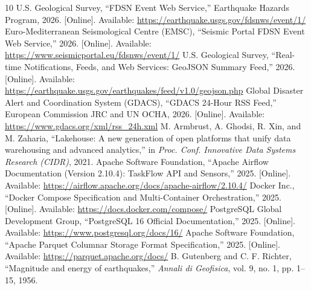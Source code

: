 \begin{thebibliography}{10}
 U.S. Geological Survey, ``FDSN Event Web Service,'' Earthquake Hazards Program, 2026. [Online]. Available: \url{https://earthquake.usgs.gov/fdsnws/event/1/}
 Euro-Mediterranean Seismological Centre (EMSC), ``Seismic Portal FDSN Event Web Service,'' 2026. [Online]. Available: \url{https://www.seismicportal.eu/fdsnws/event/1/}
 U.S. Geological Survey, ``Real-time Notifications, Feeds, and Web Services: GeoJSON Summary Feed,'' 2026. [Online]. Available: \url{https://earthquake.usgs.gov/earthquakes/feed/v1.0/geojson.php}
 Global Disaster Alert and Coordination System (GDACS), ``GDACS 24-Hour RSS Feed,'' European Commission JRC and UN OCHA, 2026. [Online]. Available: \url{https://www.gdacs.org/xml/rss_24h.xml}
 M. Armbrust, A. Ghodsi, R. Xin, and M. Zaharia, ``Lakehouse: A new generation of open platforms that unify data warehousing and advanced analytics,'' in \textit{Proc. Conf. Innovative Data Systems Research (CIDR)}, 2021.
 Apache Software Foundation, ``Apache Airflow Documentation (Version 2.10.4): TaskFlow API and Sensors,'' 2025. [Online]. Available: \url{https://airflow.apache.org/docs/apache-airflow/2.10.4/}
 Docker Inc., ``Docker Compose Specification and Multi-Container Orchestration,'' 2025. [Online]. Available: \url{https://docs.docker.com/compose/}
 PostgreSQL Global Development Group, ``PostgreSQL 16 Official Documentation,'' 2025. [Online]. Available: \url{https://www.postgresql.org/docs/16/}
 Apache Software Foundation, ``Apache Parquet Columnar Storage Format Specification,'' 2025. [Online]. Available: \url{https://parquet.apache.org/docs/}
 B. Gutenberg and C. F. Richter, ``Magnitude and energy of earthquakes,'' \textit{Annali di Geofisica}, vol. 9, no. 1, pp. 1--15, 1956.
\end{thebibliography}
